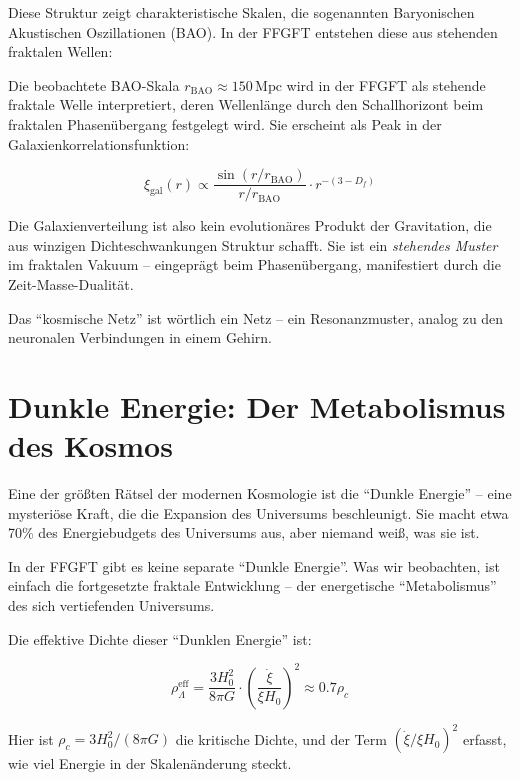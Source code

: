 Diese Struktur zeigt charakteristische Skalen, die sogenannten Baryonischen Akustischen Oszillationen (BAO). In der FFGFT entstehen diese aus stehenden fraktalen Wellen:

Die beobachtete BAO-Skala \(r_{\text{BAO}} \approx 150\,\text{Mpc}\) wird in der FFGFT als stehende fraktale Welle interpretiert, deren Wellenlänge durch den Schallhorizont beim fraktalen Phasenübergang festgelegt wird. Sie erscheint als Peak in der Galaxienkorrelationsfunktion:

\begin{equation}
\xi_{\text{gal}}(r) \propto \frac{\sin(r/r_{\text{BAO}})}{r/r_{\text{BAO}}} \cdot r^{-(3-D_f)}
\end{equation}

Die Galaxienverteilung ist also kein evolutionäres Produkt der Gravitation, die aus winzigen Dichteschwankungen Struktur schafft. Sie ist ein \textit{stehendes Muster} im fraktalen Vakuum -- eingeprägt beim Phasenübergang, manifestiert durch die Zeit-Masse-Dualität.

Das \enquote{kosmische Netz} ist wörtlich ein Netz -- ein Resonanzmuster, analog zu den neuronalen Verbindungen in einem Gehirn.

\section{Dunkle Energie: Der Metabolismus des Kosmos}

Eine der größten Rätsel der modernen Kosmologie ist die \enquote{Dunkle Energie} -- eine mysteriöse Kraft, die die Expansion des Universums beschleunigt. Sie macht etwa 70\% des Energiebudgets des Universums aus, aber niemand weiß, was sie ist.

In der FFGFT gibt es keine separate \enquote{Dunkle Energie}. Was wir beobachten, ist einfach die fortgesetzte fraktale Entwicklung -- der energetische \enquote{Metabolismus} des sich vertiefenden Universums.

Die effektive Dichte dieser \enquote{Dunklen Energie} ist:

\begin{equation}
\rho_{\Lambda}^{\text{eff}} = \frac{3H_0^2}{8\pi G} \cdot \left(\frac{\dot{\xi}}{\xi H_0}\right)^2 \approx 0.7 \rho_c
\end{equation}

Hier ist $\rho_c = 3H_0^2/(8\pi G)$ die kritische Dichte, und der Term $(\dot{\xi}/\xi H_0)^2$ erfasst, wie viel Energie in der Skalenänderung steckt.

